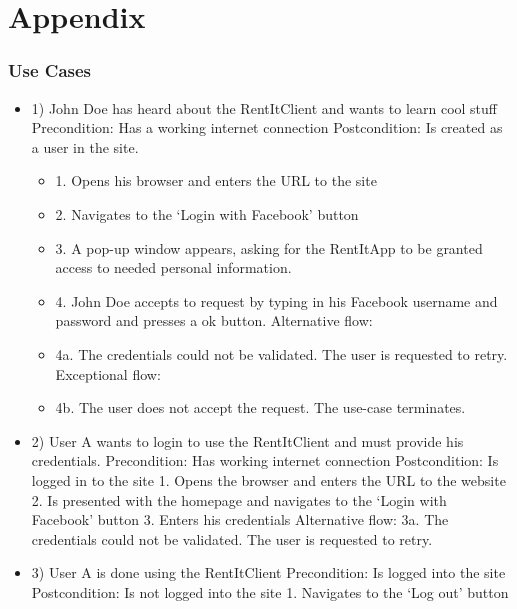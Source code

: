 \part{Appendix}
\section{Use Cases} \label{UseCases}
\begin{itemize}

\item 1)
John Doe has heard about the RentItClient and wants to learn cool stuff
\newline Precondition: Has a working internet connection
\newline Postcondition: Is created as a user in the site. 
\begin{itemize}
    \item 1. Opens his browser and enters the URL to the site
    \item 2. Navigates to the ‘Login with Facebook’ button
	\item 3. A pop-up window appears, asking for the RentItApp to be granted access to needed personal information.
	\item 4. John Doe accepts to request by typing in his Facebook username and password and presses a ok button. 
\newline Alternative flow:
    \item 4a. The credentials could not be validated. The user is requested to retry.
\newline Exceptional flow:
    \item 4b. The user does not accept the request. The use-case terminates.
\end{itemize}

\item 2)
User A wants to login to use the RentItClient and must provide his credentials.
\newline Precondition: Has working internet connection
\newline Postcondition: Is logged in to the site
    1. Opens the browser and enters the URL to the website
    2. Is presented with the homepage and navigates to the ‘Login with Facebook’ button
    3. Enters his credentials
\newline Alternative flow:
    3a. The credentials could not be validated. The user is requested to retry.

\item 3)
User A is done using the RentItClient
\newline Precondition: Is logged into the site
\newline Postcondition: Is not logged into the site
1. Navigates to the ‘Log out’ button


\end{itemize}
